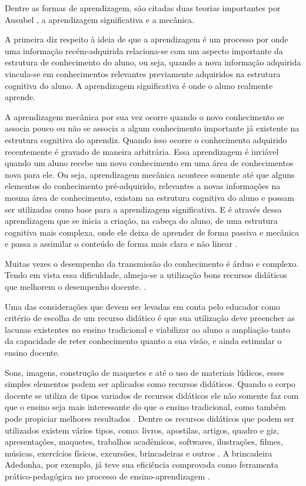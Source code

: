 Dentre as formas de aprendizagem, são citadas duas teorias importantes por Ausubel \cite{ausubel80}, a aprendizagem significativa e a mecânica.

A primeira diz respeito à ideia de que a aprendizagem é um processo por onde uma informação recém-adquirida relaciona-se com um aspecto importante da estrutura de conhecimento do aluno, ou seja, quando a nova informação adquirida vincula-se em conhecimentos relevantes previamente adquiridos na estrutura cognitiva do aluno. A aprendizagem significativa é onde o aluno realmente aprende.

A aprendizagem mecânica por sua vez ocorre quando o novo conhecimento se associa pouco ou não se associa a algum conhecimento importante já existente na estrutura cognitiva do aprendiz. Quando isso ocorre o conhecimento adquirido recentemente é gravado de maneira arbitrária. Essa aprendizagem é inviável quando um aluno recebe um novo conhecimento em uma área de conhecimentos nova para ele. Ou seja, aprendizagem mecânica acontece somente até que alguns elementos do conhecimento pré-adquirido, relevantes a novas informações na mesma área de conhecimento, existam na estrutura cognitiva do aluno e possam ser utilizadas como base para a aprendizagem significativa. E é através dessa aprendizagem que se inicia a criação, na cabeça do aluno, de uma estrutura cognitiva mais complexa, onde ele deixa de aprender de forma passiva e mecânica e passa a assimilar o conteúdo de forma mais clara e não linear \cite{ausubel80}.

Muitas vezes o desempenho da transmissão do conhecimento é árduo e complexo. Tendo em vista essa dificuldade, almeja-se a utilização bons recursos didáticos que melhorem o desempenho docente. \cite{souza07}.

Uma das considerações que devem ser levadas em conta pelo educador como critério de escolha de um recurso didático é que sua utilização deve preencher as lacunas existentes no ensino tradicional e viabilizar ao aluno a ampliação 
tanto da capacidade de reter conhecimento quanto a sua visão, e ainda estimular o ensino docente. \cite{trivelato06}

Sons, imagens, construção de maquetes e até o uso de materiais lúdicos, esses simples elementos podem ser aplicados como recursos didáticos. Quando o corpo docente se utiliza de tipos variados de recursos didáticos ele não somente faz com que o ensino seja mais interessante do que o ensino tradicional, como também pode propiciar melhores resultados \cite{parra85} \cite{souza07} \cite{costoldi09}. Dentre os recursos didáticos que podem ser utilizados existem vários tipos, como: livros, apostilas, artigos, quadro e giz, apresentações, maquetes, trabalhos acadêmicos, softwares, ilustrações, filmes, músicas, exercícios físicos, excursões, brincadeiras e outros \cite{ferreira07}. A brincadeira Adedonha, por exemplo, já teve sua eficiência comprovada como ferramenta prático-pedagógica no processo de ensino-aprendizagem \cite{silva18}.

